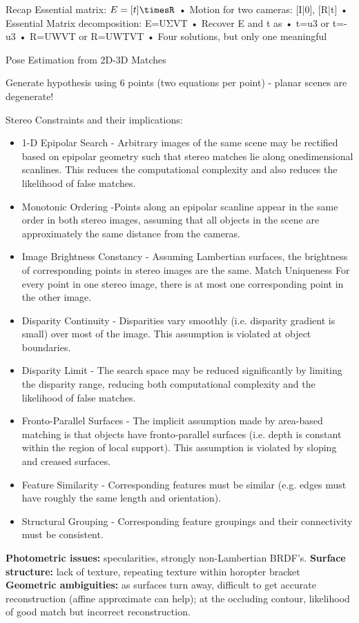 Recap Essential matrix:  $E=[t]\timesR$
• Motion for two cameras: [I|0], [R|t]
• Essential Matrix decomposition: E=UΣVT
• Recover E and t as
	• t=u3 or t=-u3
	• R=UWVT or R=UWTVT
• Four solutions, but only one meaningful

Pose Estimation from 2D-3D Matches

Generate hypothesis using 6 points (two equations per point) - planar scenes are degenerate!

Stereo Constraints and their implications:
\begin{itemize}
\item 1-D Epipolar Search -  Arbitrary images of the same scene may be rectified based on epipolar geometry such that stereo matches lie along onedimensional scanlines. This reduces the computational complexity
and also reduces the likelihood of false matches.
\item Monotonic Ordering  -Points along an epipolar scanline appear in the same order in both stereo images, assuming that all objects in the scene are approximately the same distance from the cameras.
\item Image Brightness Constancy - Assuming Lambertian surfaces, the brightness of corresponding
points in stereo images are the same.
Match Uniqueness For every point in one stereo image, there is at most one corresponding point in the other image.
\item Disparity Continuity - Disparities vary smoothly (i.e. disparity gradient is small) over most of the image. This assumption is violated at object boundaries.
\item Disparity Limit - The search space may be reduced significantly by limiting the disparity range, reducing both computational complexity and the likelihood of false matches.
\item Fronto-Parallel Surfaces - The implicit assumption made by area-based matching is that objects have fronto-parallel surfaces (i.e. depth is constant within the region of local support). This assumption is violated by sloping and creased surfaces.
\item Feature Similarity - Corresponding features must be similar (e.g. edges must have roughly the same length and orientation).
\item Structural Grouping - Corresponding feature groupings and their connectivity must be consistent.
\end{itemize}

\textbf{Photometric issues:} specularities, strongly non-Lambertian BRDF’s.
\textbf{Surface structure:} lack of texture, repeating texture within horopter bracket
\textbf{Geometric ambiguities:} as surfaces turn away, difficult to get accurate reconstruction
(affine approximate can help); at the occluding contour, likelihood of good match but incorrect
reconstruction. 

